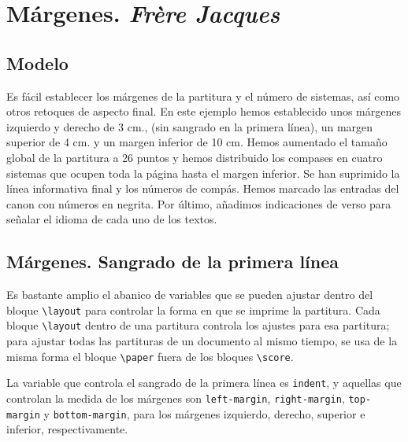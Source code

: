 \section{Márgenes. \emph{Frère Jacques}}


\subsection{Modelo}

Es fácil establecer los márgenes de la partitura y el número de
sistemas, así como otros retoques de aspecto final. En este ejemplo
hemos establecido unos márgenes izquierdo y derecho de 3 cm., (sin
sangrado en la primera línea), un margen superior de 4 cm. y un margen
inferior de 10 cm.  Hemos aumentado el tamaño global de la partitura a
26 puntos y hemos distribuido los compases en cuatro sistemas que
ocupen toda la página hasta el margen inferior.  Se han suprimido la
línea informativa final y los números de compás.  Hemos marcado las
entradas del canon con números en negrita.  Por último, añadimos
indicaciones de verso para señalar el idioma de cada uno de los
textos.

\bigskip
\begin{center}
\end{center}
\bigskip



\subsection{Márgenes.  Sangrado de la primera línea}

Es bastante amplio el abanico de variables que se pueden ajustar
dentro del bloque \verb+\layout+ para controlar la forma en que se
imprime la partitura.  Cada bloque \verb+\layout+ dentro de una
partitura controla los ajustes para esa partitura; para ajustar todas
las partituras de un documento al mismo tiempo, se usa de la misma
forma el bloque \verb+\paper+ fuera de los bloques \verb+\score+.

La variable que controla el sangrado de la primera línea es
\verb+indent+, y aquellas que controlan la medida de los márgenes son
\verb+left-margin+, \verb+right-margin+, \verb+top-margin+ y
\verb+bottom-margin+, para los márgenes izquierdo, derecho, superior e
inferior, respectivamente.

